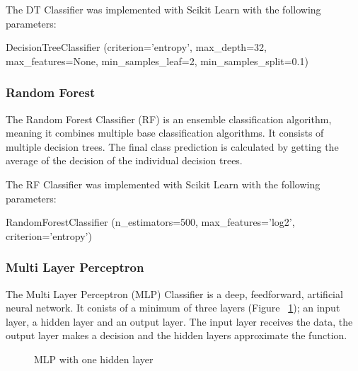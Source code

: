 The DT Classifier was implemented with Scikit Learn with the following parameters:

\begin{tcolorbox}
\begin{center}
	DecisionTreeClassifier (criterion='entropy', max\_depth=32, max\_features=None, min\_samples\_leaf=2, min\_samples\_split=0.1)
\end{center}
\end{tcolorbox}

\subsubsection*{Random Forest}


The Random Forest Classifier (RF) is an ensemble classification algorithm, meaning it combines multiple base classification algorithms. It consists of multiple decision trees. The final class prediction is calculated by getting the average of the decision of the individual decision trees.

The RF Classifier was implemented with Scikit Learn with the following parameters:

\begin{tcolorbox}
\begin{center}
	RandomForestClassifier (n\_estimators=500, max\_features='log2', criterion='entropy')
\end{center}
\end{tcolorbox}

\subsubsection*{Multi Layer Perceptron}

The Multi Layer Perceptron (MLP) Classifier is a deep, feedforward, artificial neural network. It conists of a minimum of three layers (Figure ~\ref{fig:mlp}); an input layer, a hidden layer and an output layer. The input layer receives the data, the output layer makes a decision and the hidden layers approximate the function.

\begin{figure}[h!]
\centering
{}
\caption{\label{fig:mlp} MLP with one hidden layer \cite{scikit-learn}}
\end{figure}

